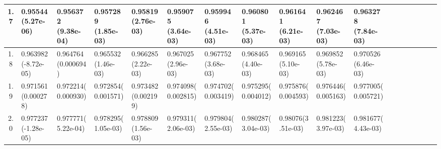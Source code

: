 \documentclass[
	article,			%
	12pt,				%
	twoside,			%
	a4paper,			%
	english,			%
	brazil,				%
	]{abntex2}
\begin{document}
\begin{landscape}
		\begin{table}\footnotesize
		\begin{tabular}{c||p{18mm}|p{18mm}|p{18mm}|p{18mm}|p{18mm}|p{18mm}|p{18mm}|p{18mm}|p{18mm}|p{18mm}|p{18mm}|p{18mm}|p{18mm}|p{18mm}|p{18mm}|p{18mm}|p{18mm}}
    			1.7 & 0.95544 \newline(5.27e-06)&0.956372 \newline(9.38e-04)&0.957289 \newline(1.85e-03)&0.95819 \newline(2.76e-03)&0.959075 \newline(3.64e-03)&0.959946 \newline(4.51e-03)&0.960801 \newline(5.37e-03)&0.961641 \newline(6.21e-03)&0.962467 \newline(7.03e-03)&0.963278 \newline(7.84e-03)\\
    			\hline
    			1.8 & 0.963982 \newline(-8.72e-05)&0.964764 \newline(0.000694)&0.965532 \newline(1.46e-03)&0.966285 \newline(2.22e-03)&0.967025 \newline(2.96e-03)&0.967752 \newline(3.68e-03)&0.968465 \newline(4.40e-03)&0.969165 \newline(5.10e-03)&0.969852 \newline(5.78e-03)&0.970526 \newline(6.46e-03)\\
    			\hline
    			1.9 &0.971561\newline(0.000278)&0.972214\newline(0.000930)&0.972854\newline(0.001571)&0.973482\newline(0.002199)&0.974098\newline(0.002815)&0.974702\newline(0.003419)&0.975295\newline(0.004012)&0.975876\newline(0.004593)&0.976446\newline(0.005163)&0.977005\newline(0.005721)\\\hline\hline
    			2.0 & 0.977237\newline(-1.28e-05)&0.977771\newline(5.22e-04)&0.978295\newline(1.05e-03)&0.978809\newline(1.56e-03)&0.979311\newline(2.06e-03)&0.979804\newline(2.55e-03)&0.980287\newline(3.04e-03)&0.98076\newline(3.51e-03)&0.981223\newline(3.97e-03)&0.981677\newline(4.43e-03)\\\hline

\end{tabular}
\end{table}
\end{landscape}
\end{document}
